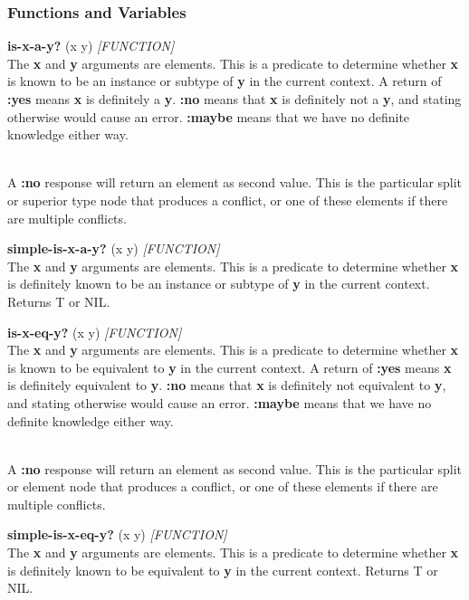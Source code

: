 \documentclass[titlepage,twoside,openright,11pt]{article}
\begin{document}
\subsubsection{Functions and Variables}\label{functions-and-variables-7}

\textbf{is-x-a-y?} (x y) \emph{{[}FUNCTION{]}}\\
The \textbf{x} and \textbf{y} arguments are elements. This is a
predicate to determine whether \textbf{x} is known to be an instance or
subtype of \textbf{y} in the current context. A return of \textbf{:yes}
means \textbf{x} is definitely a \textbf{y}. \textbf{:no} means that
\textbf{x} is definitely not a \textbf{y}, and stating otherwise would
cause an error. \textbf{:maybe} means that we have no definite knowledge
either way.\\
\strut \\
A \textbf{:no} response will return an element as second value. This is
the particular split or superior type node that produces a conflict, or
one of these elements if there are multiple conflicts.

\textbf{simple-is-x-a-y?} (x y) \emph{{[}FUNCTION{]}}\\
The \textbf{x} and \textbf{y} arguments are elements. This is a
predicate to determine whether \textbf{x} is definitely known to be an
instance or subtype of \textbf{y} in the current context. Returns T or
NIL.

\textbf{is-x-eq-y?} (x y) \emph{{[}FUNCTION{]}}\\
The \textbf{x} and \textbf{y} arguments are elements. This is a
predicate to determine whether \textbf{x} is known to be equivalent to
\textbf{y} in the current context. A return of \textbf{:yes} means
\textbf{x} is definitely equivalent to \textbf{y}. \textbf{:no} means
that \textbf{x} is definitely not equivalent to \textbf{y}, and stating
otherwise would cause an error. \textbf{:maybe} means that we have no
definite knowledge either way.\\
\strut \\
A \textbf{:no} response will return an element as second value. This is
the particular split or element node that produces a conflict, or one of
these elements if there are multiple conflicts.

\textbf{simple-is-x-eq-y?} (x y) \emph{{[}FUNCTION{]}}\\
The \textbf{x} and \textbf{y} arguments are elements. This is a
predicate to determine whether \textbf{x} is definitely known to be
equivalent to \textbf{y} in the current context. Returns T or NIL.
\end{document}
